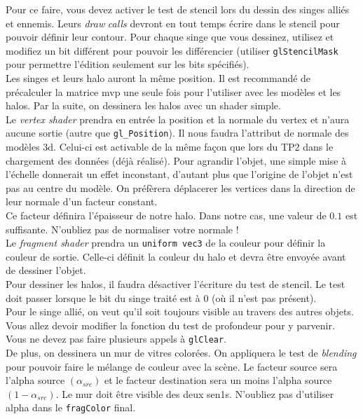 \documentclass{article}[letterpaper, 11pt]
\begin{document}
Pour ce faire, vous devez activer le test de stencil lors du dessin des singes alliés et ennemis.
Leurs \textit{draw} \textit{calls} devront en tout temps écrire dans le stencil pour pouvoir définir leur contour.
Pour chaque singe que vous dessinez, utilisez et modifiez un bit différent pour pouvoir les différencier (utiliser \texttt{glStencilMask} pour permettre l'édition seulement sur les bits spécifiés).\vspace*{11pt}
\\
Les singes et leurs halo auront la même position. Il est recommandé de précalculer la matrice mvp
une seule fois pour l'utiliser avec les modèles et les halos. Par la suite, on dessinera les halos avec
un shader simple.\vspace*{11pt}
\\
Le \textit{vertex shader} prendra en entrée la position et la normale du vertex et n'aura aucune sortie (autre que \texttt{gl\_Position}). Il nous faudra l'attribut de normale des modèles 3d. Celui-ci est activable de la même façon que lors du TP2 dans le chargement des données (déjà réalisé). Pour agrandir l'objet, une simple mise à l'échelle donnerait un effet inconstant, d'autant plus que l'origine de l'objet n'est pas au centre du modèle. On préfèrera déplacerer les vertices dans la direction de leur normale d'un facteur constant.
\\
Ce facteur définira l'épaisseur de notre halo. Dans notre cas, une valeur de $0.1$ est suffisante. N'oubliez pas de normaliser votre normale !\vspace*{11pt}
\\
Le \textit{fragment shader} prendra un \texttt{uniform vec3} de la couleur pour définir la couleur de sortie. Celle-ci définit la couleur du halo et devra être envoyée avant de dessiner l'objet.\vspace*{11pt}
\\
Pour dessiner les halos, il faudra désactiver l'écriture du test de stencil. Le test doit passer lorsque le bit du singe traité est à 0 (où il n'est pas présent).\vspace*{11pt}
\\
Pour le singe allié, on veut qu'il soit toujours visible au travers des autres objets. Vous allez devoir
modifier la fonction du test de profondeur pour y parvenir.
\vspace*{11pt}
\\
Vous ne devez pas faire plusieurs appels à \texttt{glClear}.\vspace*{11pt}
\\
De plus, on dessinera un mur de vitres colorées. On appliquera le test de \textit{blending} pour pouvoir faire le mélange de couleur avec la scène. Le facteur source sera l'alpha source $(\alpha_{src})$ et le facteur destination sera un moins l'alpha source $(1-\alpha_{src})$.
Le mur doit être visible des deux sen1s. N'oubliez pas d'utiliser alpha dans le \texttt{fragColor} final.
\end{document}
